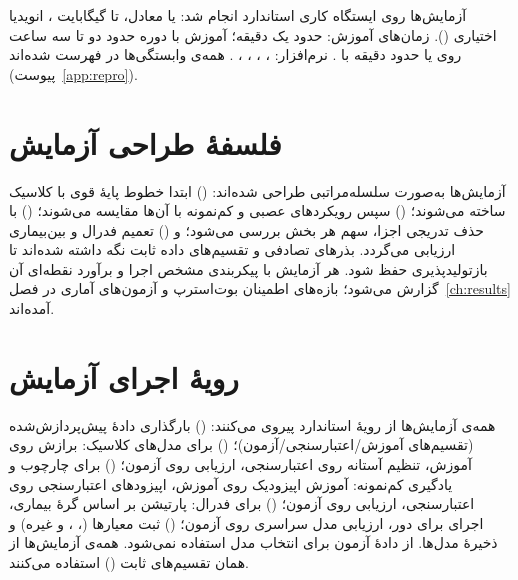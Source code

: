 آزمایش‌ها روی ایستگاه کاری استاندارد انجام شد:  یا معادل،  تا  گیگابایت ،  انویدیا اختیاری (). زمان‌های آموزش:  حدود یک دقیقه؛ آموزش  با  دوره حدود دو تا سه ساعت روی  یا حدود  دقیقه با . نرم‌افزار: ، ، ، ، . همه‌ی وابستگی‌ها در \texttt{} فهرست شده‌اند (پیوست~\ref{app:repro}).

\section{فلسفۀ طراحی آزمایش}

آزمایش‌ها به‌صورت سلسله‌مراتبی طراحی شده‌اند: () ابتدا خطوط پایۀ قوی با  کلاسیک ساخته می‌شوند؛ () سپس رویکردهای عصبی و کم‌نمونه با آن‌ها مقایسه می‌شوند؛ () با حذف تدریجی اجزا، سهم هر بخش بررسی می‌شود؛ و () تعمیم فدرال و بین‌بیماری ارزیابی می‌گردد. بذرهای تصادفی و تقسیم‌های داده ثابت نگه داشته شده‌اند تا بازتولیدپذیری حفظ شود. هر آزمایش با پیکربندی مشخص اجرا و برآورد نقطه‌ای آن گزارش می‌شود؛ بازه‌های اطمینان بوت‌استرپ و آزمون‌های آماری در فصل~\ref{ch:results} آمده‌اند.

\section{رویۀ اجرای آزمایش}

همه‌ی آزمایش‌ها از رویۀ استاندارد پیروی می‌کنند: () بارگذاری دادۀ پیش‌پردازش‌شده (تقسیم‌های آموزش/اعتبارسنجی/آزمون)؛ () برای مدل‌های کلاسیک: برازش روی آموزش، تنظیم آستانه روی اعتبارسنجی، ارزیابی روی آزمون؛ () برای چارچوب  و یادگیری کم‌نمونه: آموزش اپیزودیک روی آموزش، اپیزودهای اعتبارسنجی روی اعتبارسنجی، ارزیابی روی آزمون؛ () برای فدرال: پارتیشن بر اساس گرۀ بیماری، اجرای  برای  دور، ارزیابی مدل سراسری روی آزمون؛ () ثبت معیارها (، ، و غیره) و ذخیرۀ مدل‌ها. از دادۀ آزمون برای انتخاب مدل استفاده نمی‌شود. همه‌ی آزمایش‌ها از همان تقسیم‌های ثابت () استفاده می‌کنند.

